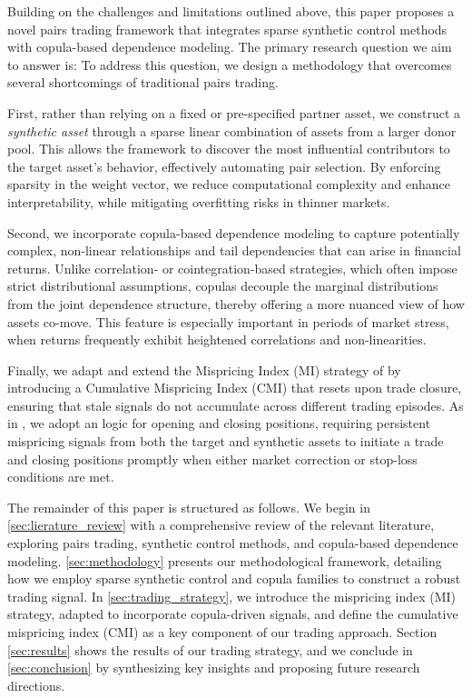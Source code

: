 Building on the challenges and limitations outlined above, this paper proposes a novel pairs trading framework that integrates sparse synthetic control methods with copula-based dependence modeling. 
%
%
The primary research question we aim to answer is: 
%
%
To address this question, we design a methodology that overcomes several shortcomings of traditional pairs trading. 

First, rather than relying on a fixed or pre-specified partner asset, we construct a \emph{synthetic asset} through a sparse linear combination of assets from a larger donor pool. This allows the framework to discover the most influential contributors to the target asset's behavior, effectively automating pair selection. By enforcing sparsity in the weight vector, we reduce computational complexity and enhance interpretability, while mitigating overfitting risks in thinner markets.

Second, we incorporate copula-based dependence modeling to capture potentially complex, non-linear relationships and tail dependencies that can arise in financial returns. Unlike correlation- or cointegration-based strategies, which often impose strict distributional assumptions, copulas decouple the marginal distributions from the joint dependence structure, thereby offering a more nuanced view of how assets co-move. This feature is especially important in periods of market stress, when returns frequently exhibit heightened correlations and non-linearities.

Finally, we adapt and extend the Mispricing Index (MI) strategy of \cite{Xie2016} by introducing a Cumulative Mispricing Index (CMI) that resets upon trade closure, ensuring that stale signals do not accumulate across different trading episodes. As in \cite{Rad2016}, we adopt an  logic for opening and closing positions, requiring persistent mispricing signals from both the target and synthetic assets to initiate a trade and closing positions promptly when either market correction or stop-loss conditions are met.


The remainder of this paper is structured as follows. We begin in \cref{sec:lierature_review} with a comprehensive review of the relevant literature, exploring pairs trading, synthetic control methods, and copula-based dependence modeling. \cref{sec:methodology} presents our methodological framework, detailing how we employ sparse synthetic control and copula families to construct a robust trading signal. In \cref{sec:trading_strategy}, we introduce the mispricing index (MI) strategy, adapted to incorporate copula-driven signals, and define the cumulative mispricing index (CMI) as a key component of our trading approach. Section \ref{sec:results} shows the results of our trading strategy, and we conclude in \cref{sec:conclusion} by synthesizing key insights and proposing future research directions.

